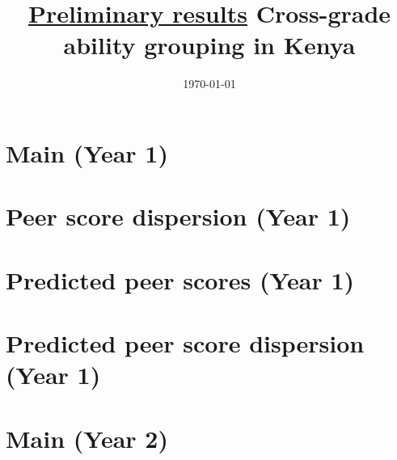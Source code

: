 \documentclass[11pt]{article}
\title{\underline{Preliminary results} \linebreak
	Cross-grade ability grouping in Kenya}
\date{\today}
\begin{document}
	\maketitle

\centering

\section*{Main (Year 1)}

\begin{table}[H]
	\caption{Academy cohort fixed effects}
	
\end{table}

\begin{table}[H]
	\caption{Academy cohort and county fixed effects}
	
\end{table}

\begin{table}[H]
	\caption{Academy fixed effects}
	
\end{table}

\section*{Peer score dispersion (Year 1)}

\begin{table}[H]
	\caption{Academy fixed effects}
	
\end{table}

\section*{Predicted peer scores (Year 1)}

\begin{table}[H]
	\caption{Academy cohort fixed effects}
	
\end{table}

\section*{Predicted peer score dispersion (Year 1)}

\begin{table}[H]
	\caption{Academy cohort fixed effects}
	
\end{table}

\section*{Main (Year 2)}
\begin{table}[H]
	\caption{Academy cohort fixed effects}
	
\end{table}
\end{document}

